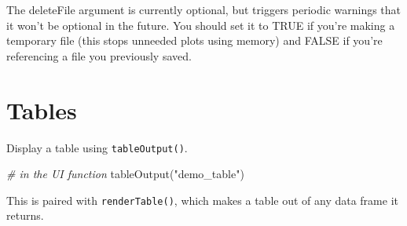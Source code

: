 \documentclass[
  oneside]{book}
\newenvironment{Shaded}{\begin{snugshade}}{\end{snugshade}}
\newcommand{\AttributeTok}[1]{\textcolor[rgb]{0.77,0.63,0.00}{#1}}
\newcommand{\CommentTok}[1]{\textcolor[rgb]{0.56,0.35,0.01}{\textit{#1}}}
\newcommand{\ConstantTok}[1]{\textcolor[rgb]{0.00,0.00,0.00}{#1}}
\newcommand{\DecValTok}[1]{\textcolor[rgb]{0.00,0.00,0.81}{#1}}
\newcommand{\FunctionTok}[1]{\textcolor[rgb]{0.00,0.00,0.00}{#1}}
\newcommand{\NormalTok}[1]{#1}
\newcommand{\OtherTok}[1]{\textcolor[rgb]{0.56,0.35,0.01}{#1}}
\newcommand{\SpecialCharTok}[1]{\textcolor[rgb]{0.00,0.00,0.00}{#1}}
\newcommand{\StringTok}[1]{\textcolor[rgb]{0.31,0.60,0.02}{#1}}
\begin{document}
\begin{Shaded}
\end{Shaded}

\begin{warning}
The \AttributeTok{deleteFile} argument is currently optional, but triggers periodic warnings that it won't be optional in the future. You should set it to \ConstantTok{TRUE} if you're making a temporary file (this stops unneeded plots using memory) and \ConstantTok{FALSE} if you're referencing a file you previously saved.

\end{warning}

\hypertarget{tables}{%
\section{Tables}\label{tables}}

Display a table using \texttt{tableOutput}\texttt{()}.

\begin{Shaded}
\begin{Highlighting}[]
\CommentTok{\# in the UI function}
\FunctionTok{tableOutput}\NormalTok{(}\StringTok{"demo\_table"}\NormalTok{)}
\end{Highlighting}
\end{Shaded}

This is paired with \texttt{renderTable}\texttt{()}, which makes a table out of any data frame it returns.

\begin{Shaded}
\end{Shaded}
\end{document}
